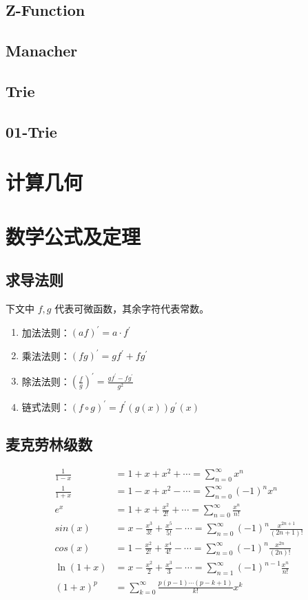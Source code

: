 \documentclass{article}
\begin{document}
\subsection{Z-Function}

\subsection{Manacher}

\subsection{Trie}

\subsection{01-Trie}




\section{计算几何}




\section{数学公式及定理}
\subsection{求导法则}
下文中 $f,g$ 代表可微函数，其余字符代表常数。
\begin{enumerate}
    \item 加法法则：$(af)^{\prime} = a\cdot f^{\prime}$
    \item 乘法法则：$(fg)^{\prime}=gf^{\prime}+fg^{\prime}$
    \item 除法法则：$(\frac{f}{g})^{\prime}=\frac{gf^{\prime}-fg^{\prime}}{g^2}$
    \item 链式法则：$(f\circ g)^{\prime} = f^{\prime}(g(x))g^{\prime}(x)$
\end{enumerate}
\subsection{麦克劳林级数}
$$
\begin{aligned}
\frac{1}{1-x} &= 1+x+x^2+\cdots=\sum_{n=0}^{\infty}{x^n}\\
\frac{1}{1+x} &= 1-x+x^2-\cdots=\sum_{n=0}^{\infty}{(-1)^nx^n}\\
e^x &=1+x+\frac{x^2}{2!}+\cdots=\sum_{n=0}^{\infty}{\frac{x^n}{n!}}\\
sin(x) &=x-\frac{x^3}{3!}+\frac{x^5}{5!}-\cdots=\sum_{n=0}^{\infty}{(-1)^n\frac{x^{2n+1}}{(2n+1)!}}\\
cos(x) &=1-\frac{x^2}{2!}+\frac{x^4}{4!}-\cdots=\sum_{n=0}^{\infty}{(-1)^n\frac{x^{2n}}{(2n)!}}\\
\ln(1+x) &= x-\frac{x^2}{2}+\frac{x^3}{3}-\cdots =\sum_{n=1}^{\infty}{(-1)^{n-1}\frac{x^{n}}{n!}}\\
(1+x)^p &= \sum_{k=0}^{\infty}{\frac{p(p-1)\cdots(p-k+1)}{k!}x^k}\\ 
\end{aligned}
$$
\end{document}
